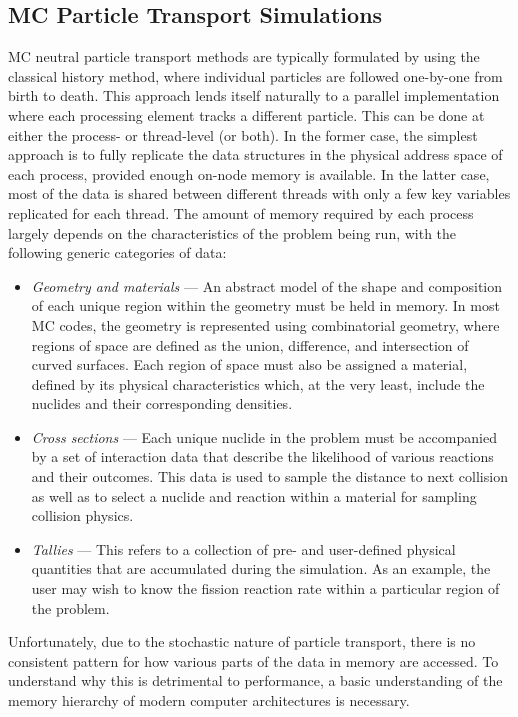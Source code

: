 \documentclass{mc2015}
\begin{document}
\subsection{MC Particle Transport Simulations}

MC neutral particle transport methods are typically formulated by using the
classical history method, where individual particles are followed one-by-one
from birth to death. This approach lends itself naturally to a parallel
implementation where each processing element tracks a different particle. This
can be done at either the process- or thread-level (or both). In the former
case, the simplest approach is to fully replicate the data structures in the
physical address space of each process, provided enough on-node memory is
available. In the latter case, most of the data is shared between different
threads with only a few key variables replicated for each thread. The amount of
memory required by each process largely depends on the characteristics of the
problem being run, with the following generic categories of data:
\begin{itemize}
\item \emph{Geometry and materials} --- An abstract model of the shape and
  composition of each unique region within the geometry must be held in
  memory. In most MC codes, the geometry is represented using combinatorial
  geometry, where regions of space are defined as the union, difference, and
  intersection of curved surfaces. Each region of space must also be assigned a
  material, defined by its physical characteristics which, at the very least,
  include the nuclides and their corresponding densities.
\item \emph{Cross sections} --- Each unique nuclide in the problem must be
  accompanied by a set of interaction data that describe the likelihood of
  various reactions and their outcomes. This data is used to sample the
  distance to next collision as well as to select a nuclide and reaction within
  a material for sampling collision physics.
\item \emph{Tallies} --- This refers to a collection of pre- and user-defined
  physical quantities that are accumulated during the simulation. As an
  example, the user may wish to know the fission reaction rate within a
  particular region of the problem.
\end{itemize}
Unfortunately, due to the stochastic nature of particle transport, there is no
consistent pattern for how various parts of the data in memory are
accessed. To understand why this is detrimental to performance, a basic
understanding of the memory hierarchy of modern computer architectures is
necessary.
\end{document}
